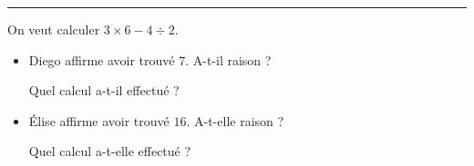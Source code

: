 \documentclass[a4paper,11pt]{article}
\begin{document}
\hrule
\vspace{0.05\textheight}

\begin{minipage}[t][0.45\textheight][t]{\textwidth}

	\begin{exercice}[(2 points)]
		On veut calculer $3 × 6 - 4 ÷ 2$.
		\begin{itemize}
			\item Diego affirme avoir trouvé $7$. A-t-il raison ?

			      Quel calcul a-t-il effectué ? \vspace{3cm}
			\item Élise affirme avoir trouvé $16$. A-t-elle raison ?

			      Quel calcul a-t-elle effectué ?\vspace{3cm}
		\end{itemize}
	\end{exercice}

\end{minipage}
\end{document}
